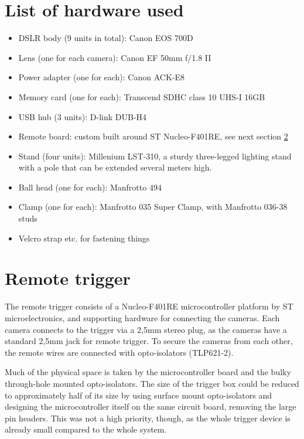 \section{List of hardware used} \label{app:hardwareused}

\begin{itemize}
	\item DSLR body (9 units in total): Canon EOS 700D
	\item Lens (one for each camera): Canon EF 50mm f/1.8 II
	\item Power adapter (one for each): Canon ACK-E8
	\item Memory card (one for each): Transcend SDHC class 10 UHS-I 16GB
	\item USB hub (3 units): D-link DUB-H4
	\item Remote board: custom built around ST Nucleo-F401RE, see next section \ref{app:remotetrigger}
	\item Stand (four units): Millenium LST-310, a sturdy three-legged lighting stand with a pole that can be extended several meters high.
	\item Ball head (one for each): Manfrotto 494
	\item Clamp (one for each): Manfrotto 035 Super Clamp, with Manfrotto 036-38 studs
	\item Velcro strap etc. for fastening things
\end{itemize}

\clearpage

\section{Remote trigger} \label{app:remotetrigger}

The remote trigger consists of a Nucleo-F401RE microcontroller platform by ST microelectronics, and supporting hardware for connecting the cameras.
Each camera connects to the trigger via a 2,5mm stereo plug, as the cameras have a standard 2,5mm jack for remote trigger.
To secure the cameras from each other, the remote wires are connected with opto-isolators (TLP621-2).

Much of the physical space is taken by the microcontroller board and the bulky through-hole mounted opto-isolators.
The size of the trigger box could be reduced to approximately half of its size by using surface mount opto-isolators and designing the microcontroller itself on the same circuit board, removing the large pin headers.
This was not a high priority, though, as the whole trigger device is already small compared to the whole system.

